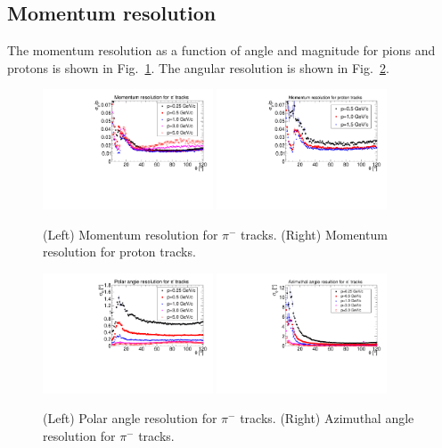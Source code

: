 \subsection{Momentum resolution}

The momentum resolution as a function of angle and magnitude for pions and 
protons is shown in Fig.~\ref{fig:dp_p}.  The angular resolution is shown in 
Fig.~\ref{fig:angle res}.


\begin{figure}[tbp]
\begin{center}
\includegraphics[width=0.45\textwidth]{figures/PionMomentumResolution.pdf}
\includegraphics[width=0.45\textwidth]{figures/ProtonMomentumResolution.pdf}
\caption{\label{fig:dp_p} (Left) Momentum resolution for $\pi^-$ tracks.
(Right) Momentum resolution for proton tracks.}
\end{center}
\end{figure}

\begin{figure}[tbp]
\begin{center}
\includegraphics[width=0.45\textwidth]{figures/PionThetaResolution.pdf}
\includegraphics[width=0.45\textwidth]{figures/PionPhiResolution.pdf}
\caption{\label{fig:angle res} (Left) Polar angle resolution for $\pi^-$ tracks.
(Right) Azimuthal angle resolution for $\pi^-$ tracks.}
\end{center}
\end{figure}


